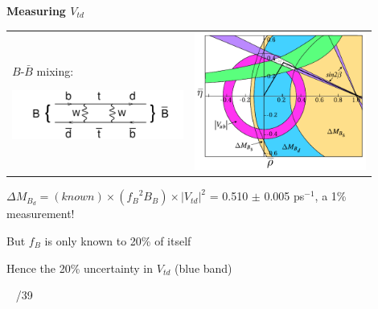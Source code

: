 \documentclass[landscape]{article}
\newenvironment{slide}[1][ ]{}{\mbox{ } \hfill \arabic{page}/39 \pagebreak}
\begin{document}
\begin{slide}
{\Huge \bf Measuring $V_{td}$}

\vspace{0.75 cm}

\begin{tabular}{p{0.45\linewidth} p{0.45\linewidth}}
\begin{minipage}{\linewidth}
$B$-$\bar{B}$ mixing:

\vspace{0.25 cm}
\includegraphics[width=\linewidth]{diagram_Bmix_box}

\end{minipage} &
\begin{minipage}{\linewidth}
\includegraphics[width=\linewidth]{ckm04}
\end{minipage}
\end{tabular}

\vfill

$\Delta M_{B_d} = (known) \times ({f_B}^2 B_B) \times |V_{td}|^2$ = 0.510 $\pm$ 0.005 ps$^{-1}$, a 1\% measurement!

\vspace{1 cm}

But $f_B$ is only known to 20\% of itself

\vspace{1 cm}

Hence the 20\% uncertainty in $V_{td}$ (blue band)

\vfill
\end{slide}
\end{document}
